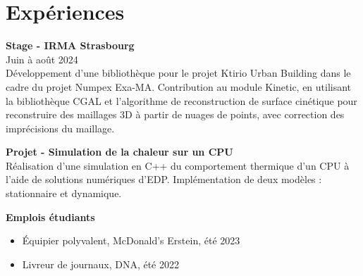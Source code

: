 \documentclass[a4paper,10pt]{article}
\begin{document}
\section*{Expériences}
\noindent
\textbf{Stage - IRMA Strasbourg} \\
Juin à août 2024 \\
Développement d'une bibliothèque pour le projet Ktirio Urban Building dans le cadre du projet Numpex Exa-MA. Contribution au module Kinetic, en utilisant la bibliothèque CGAL et l'algorithme de reconstruction de surface cinétique pour reconstruire des maillages 3D à partir de nuages de points, avec correction des imprécisions du maillage.

\noindent
\textbf{Projet - Simulation de la chaleur sur un CPU} \\
Réalisation d'une simulation en C++ du comportement thermique d'un CPU à l'aide de solutions numériques d'EDP. Implémentation de deux modèles : stationnaire et dynamique.


\noindent
\textbf{Emplois étudiants}
\begin{itemize}
    \item Équipier polyvalent, McDonald's Erstein, été 2023
    \item Livreur de journaux, DNA, été 2022
\end{itemize}
\end{document}
